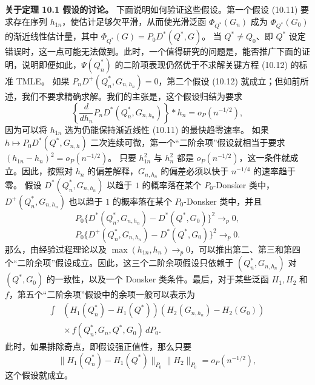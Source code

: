 \noindent\textbf{关于定理 10.1 假设的讨论。}
下面说明如何验证这些假设。第一个假设 (10.11) 要求存在序列 $h_{1n}$，使估计足够欠平滑，从而使光滑泛函 $\Phi_{Q^*}(G_n)$ 成为 $\Phi_{Q^*}(G_0)$ 的渐近线性估计量，其中
$\Phi_{Q^*}(G)=P_0D^*(Q^*,G)$。
当 $Q^*\ne Q_0$、即 $Q^*$ 设定错误时，这一点可能无法做到。此时，一个值得研究的问题是，能否推广下面的证明，说明即便如此，$\Psi(Q_n^*)$ 的二阶项表现仍然优于不求解关键方程 (10.12) 的标准 TMLE。
如果 $P_nD^+(Q_n^*,G_{n,h_n})=0$，第二个假设 (10.12) 就成立；但如前所述，我们不要求精确求解。我们的主张是，这个假设归结为要求
\[
 \left\{\frac{d}{dh_n}P_nD^*(Q_n^*,G_{n,h_n})\right\}
 \ast h_n=o_P(n^{-1/2}),
\]
因为可以将 $h_{1n}$ 选为仍能保持渐近线性 (10.11) 的最快趋零速率。
如果 $h\mapsto P_0D^*(Q^*,G_{n,h})$ 二次连续可微，第一个“二阶余项”假设就相当于要求
$(h_{1n}-h_n)^2=o_P(n^{-1/2})$。
只要 $h_{1n}^2$ 与 $h_n^2$ 都是 $o_P(n^{-1/2})$，这一条件就成立。因此，按照对 $h_n$ 的偏差解释，$G_{n,h_n}$ 的偏差必须以快于 $n^{-1/4}$ 的速率趋于零。
假设 $D^*(Q_n^*,G_{n,h_n})$ 以趋于 $1$ 的概率落在某个 $P_0$-Donsker 类中，$D^+(Q_n^*,G_{n,h_n})$ 也以趋于 $1$ 的概率落在某个 $P_0$-Donsker 类中，并且
\[
 P_0\{D^*(Q_n^*,G_{n,h_n})-D^*(Q^*,G_0)\}^2
 \longrightarrow_p0,
\]
\[
 P_0\{D^+(Q_n^*,G_{n,h_n})-D^*(Q^*,G_0)\}^2
 \longrightarrow_p0.
\]
那么，由经验过程理论以及 $\max(h_{1n},h_n)\longrightarrow_p0$，可以推出第二、第三和第四个“二阶余项”假设成立。因此，这三个二阶余项假设只依赖于 $(Q_n^*,G_{n,h_n})$ 对 $(Q^*,G_0)$ 的一致性，以及一个 Donsker 类条件。最后，对于某些泛函 $H_1,H_2$ 和 $f$，第五个“二阶余项”假设中的余项一般可以表示为
\[
 \begin{aligned}
 \int &(H_1(Q_n^*)-H_1(Q^*))(H_2(G_{n,h_n})-H_2(G_0))\\
      &{}\times f(Q_n^*,G_n,Q^*,G_0)\,dP_0.
 \end{aligned}
\]
此时，如果排除奇点，即假设强正值性，那么只要
\[
 \|H_1(Q_n^*)-H_1(Q^*)\|_{P_0}\|H_2\|_{P_0}
 =o_P(n^{-1/2}),
\]
这个假设就成立。

